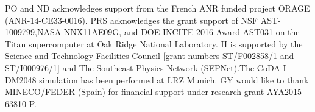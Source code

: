 \documentclass[twocolumn]{aastex61}
\begin{document}


\acknowledgments
PO and ND acknowledges support from the French ANR funded project ORAGE (ANR-14-CE33-0016). PRS acknowledges the grant support of NSF AST-1009799,NASA NNX11AE09G, and DOE INCITE 2016 Award AST031 on the Titan supercomputer at Oak Ridge National Laboratory. II is supported by the Science and Technology Facilities Council [grant numbers ST/F002858/1 and ST/I000976/1] and The Southeast Physics Network (SEPNet).The CoDA I-DM2048 simulation has been performed at LRZ Munich. GY would like to thank MINECO/FEDER (Spain) for financial support under research grant AYA2015-63810-P.
\end{document}
